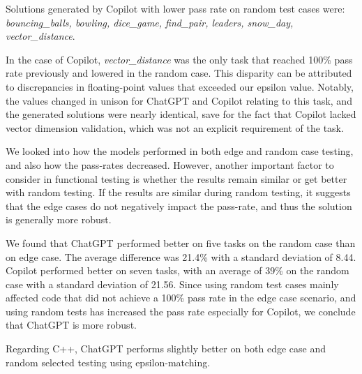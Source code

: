 Solutions generated by Copilot with lower pass rate on random test cases were:
\textit{bouncing\_balls,
	bowling,
	dice\_game,
	find\_pair,
	leaders,
	snow\_day,
	vector\_distance}.

In the case of Copilot, \textit{vector\_distance} was the only task that reached 100\% pass rate previously and lowered in the random case.
This disparity can be attributed to discrepancies in floating-point values that exceeded our epsilon value.
Notably, the values changed in unison for ChatGPT and Copilot relating to this task, and the generated solutions were nearly identical, save for the fact that Copilot lacked vector dimension validation, which was not an explicit requirement of the task.

We looked into how the models performed in both edge and random case testing, and also how the pass-rates decreased.
However, another important factor to consider in functional testing is whether the results remain similar or get better with random testing.
If the results are similar during random testing, it suggests that the edge cases do not negatively impact the pass-rate, and thus the solution is generally more robust.

We found that ChatGPT performed better on five tasks on the random case than on edge case.
The average difference was 21.4\% with a standard deviation of 8.44.
Copilot performed better on seven tasks, with an average of 39\% on the random case with a standard deviation of 21.56.
Since using random test cases mainly affected code that did not achieve a 100\% pass rate in the edge case scenario, and using random tests has increased the pass rate especially for Copilot, we conclude that ChatGPT is more robust.

Regarding C++, ChatGPT performs slightly better on both edge case and random selected testing using epsilon-matching.


